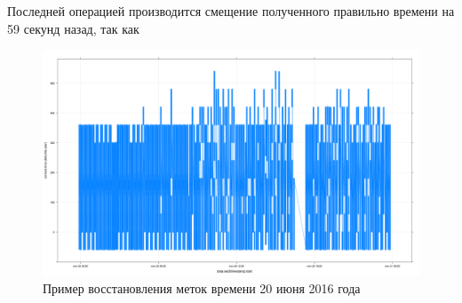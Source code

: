 Последней операцией производится смещение полученного правильно времени на 59 
секунд назад, так как 






\begin{figure}
	\centering
	\includegraphics[width=0.9\linewidth]{images/depron_time_172}
	\caption{Пример восстановления меток времени 20 июня 2016 года}
	\label{fig:deprontime172}
\end{figure}







